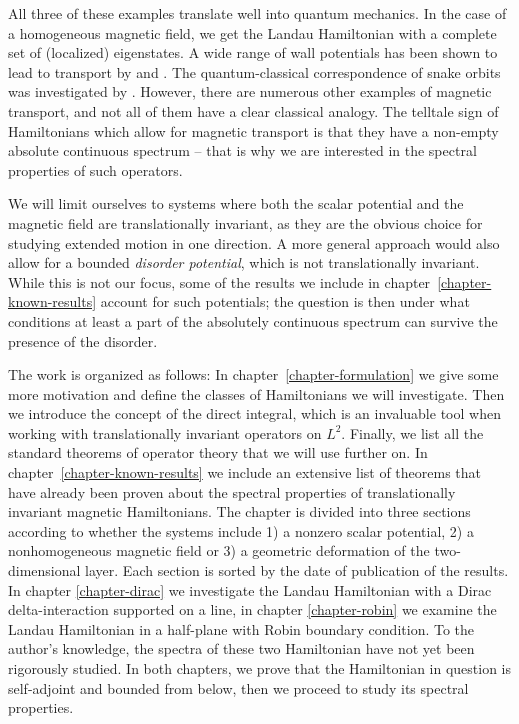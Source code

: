 All three of these examples translate well into quantum mechanics. In the case of a homogeneous magnetic field, we get the Landau Hamiltonian with a complete set of (localized) eigenstates. A wide range of wall potentials has been shown to lead to transport by \cite{Macris1999} and \cite{Frohlich2000}. The quantum-classical correspondence of snake orbits was investigated by \cite{Reijniers2000}. However, there are numerous other examples of magnetic transport, and not all of them have a clear classical analogy. The telltale sign of Hamiltonians which allow for magnetic transport is that they have a non-empty absolute continuous spectrum – that is why we are interested in the spectral properties of such operators.

We will limit ourselves to systems where both the scalar potential and the magnetic field are translationally invariant, as they are the obvious choice for studying extended motion in one direction. A more general approach would also allow for a bounded \textit{disorder potential}, which is not translationally invariant. While this is not our focus, some of the results we include in chapter~\ref{chapter-known-results} account for such potentials; the question is then under what conditions at least a part of the absolutely continuous spectrum can survive the presence of the disorder.

The work is organized as follows: In chapter~\ref{chapter-formulation} we give some more motivation and define the classes of Hamiltonians we will investigate. Then we introduce the concept of the direct integral, which is an invaluable tool when working with translationally invariant operators on $L^2$. Finally, we list all the standard theorems of operator theory that we will use further on. In chapter~\ref{chapter-known-results} we include an extensive list of theorems that have already been proven about the spectral properties of translationally invariant magnetic Hamiltonians. The chapter is divided into three sections according to whether the systems include 1) a nonzero scalar potential, 2) a nonhomogeneous magnetic field or 3) a geometric deformation of the two-dimensional layer. Each section is sorted by the date of publication of the results. In chapter \ref{chapter-dirac} we investigate the Landau Hamiltonian with a Dirac delta-interaction supported on a line, in chapter \ref{chapter-robin} we examine the Landau Hamiltonian in a half-plane with Robin boundary condition. To the author's knowledge, the spectra of these two Hamiltonian have not yet been rigorously studied. In both chapters, we prove that the Hamiltonian in question is self-adjoint and bounded from below, then we proceed to study its spectral properties.
